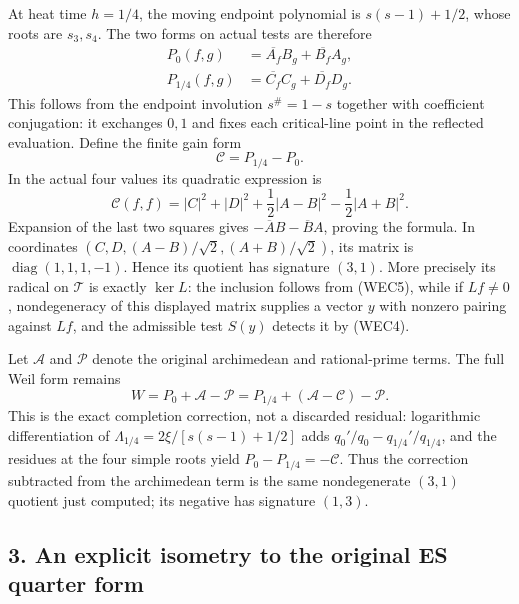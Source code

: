 \documentclass[
  10pt,
  a4paper,
]{article}
\begin{document}
At heat time \(h=1/4\), the moving endpoint polynomial is
\(s(s-1)+1/2\), whose roots are \(s_3,s_4\). The two forms on actual
tests are therefore \[
\begin{aligned}
P_0(f,g)&=\overline{A_f}B_g+\overline{B_f}A_g,\\
P_{1/4}(f,g)&=\overline{C_f}C_g+\overline{D_f}D_g.
\end{aligned}
\tag{WEC5}
\] This follows from the endpoint involution \(s^\#=1-s\) together with
coefficient conjugation: it exchanges \(0,1\) and fixes each
critical-line point in the reflected evaluation. Define the finite gain
form \[
\mathcal C=P_{1/4}-P_0.
\tag{WEC6}
\] In the actual four values its quadratic expression is \[
\mathcal C(f,f)=|C|^2+|D|^2+\frac{1}{2}|A-B|^2-\frac{1}{2}|A+B|^2.
\tag{WEC7}
\] Expansion of the last two squares gives
\(-\overline A B-\overline B A\), proving the formula. In coordinates
\((C,D,(A-B)/\sqrt2,(A+B)/\sqrt2)\), its matrix is
\(\operatorname{diag}(1,1,1,-1)\). Hence its quotient has signature
\((3,1)\). More precisely its radical on \(\mathcal T\) is exactly
\(\ker L\): the inclusion follows from (WEC5), while if \(Lf\ne0\),
nondegeneracy of this displayed matrix supplies a vector \(y\) with
nonzero pairing against \(Lf\), and the admissible test \(S(y)\) detects
it by (WEC4).

Let \(\mathcal A\) and \(\mathcal P\) denote the original archimedean
and rational-prime terms. The full Weil form remains \[
W=P_0+\mathcal A-\mathcal P
=P_{1/4}+(\mathcal A-\mathcal C)-\mathcal P.
\tag{WEC8}
\] This is the exact completion correction, not a discarded residual:
logarithmic differentiation of \(\Lambda_{1/4}=2\xi/[s(s-1)+1/2]\) adds
\(q_0'/q_0-q_{1/4}'/q_{1/4}\), and the residues at the four simple roots
yield \(P_0-P_{1/4}=-\mathcal C\). Thus the correction subtracted from
the archimedean term is the same nondegenerate \((3,1)\) quotient just
computed; its negative has signature \((1,3)\).

\subsection{3. An explicit isometry to the original ES quarter
form}\label{an-explicit-isometry-to-the-original-es-quarter-form}
\end{document}

